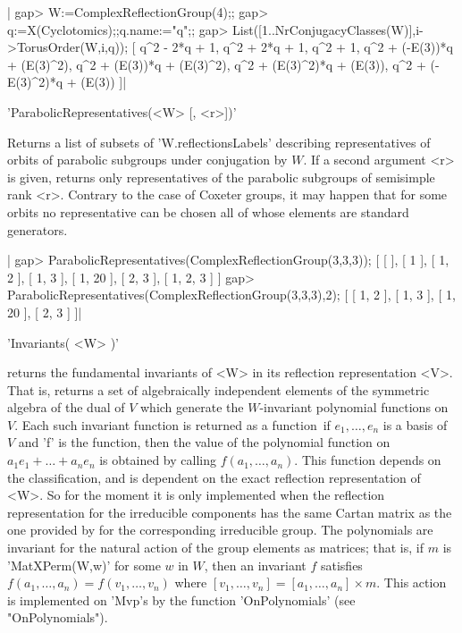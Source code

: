 |    gap> W:=ComplexReflectionGroup(4);;
    gap> q:=X(Cyclotomics);;q.name:="q";;
    gap> List([1..NrConjugacyClasses(W)],i->TorusOrder(W,i,q));
    [ q^2 - 2*q + 1, q^2 + 2*q + 1, q^2 + 1, q^2 + (-E(3))*q + (E(3)^2),
      q^2 + (E(3))*q + (E(3)^2), q^2 + (E(3)^2)*q + (E(3)),
      q^2 + (-E(3)^2)*q + (E(3)) ]|


'ParabolicRepresentatives(<W> [, <r>])'

Returns   a   list   of   subsets   of   'W.reflectionsLabels'   describing
representatives  of orbits of parabolic subgroups under conjugation by $W$.
If  a second  argument <r>  is given,  returns only  representatives of the
parabolic subgroups of semisimple rank <r>.
Contrary  to the case of Coxeter groups, it may happen that for some orbits
no  representative  can  be  chosen  all  of  whose  elements  are standard
generators.

|    gap> ParabolicRepresentatives(ComplexReflectionGroup(3,3,3));
    [ [  ], [ 1 ], [ 1, 2 ], [ 1, 3 ], [ 1, 20 ], [ 2, 3 ], [ 1, 2, 3 ] ]
    gap> ParabolicRepresentatives(ComplexReflectionGroup(3,3,3),2);
    [ [ 1, 2 ], [ 1, 3 ], [ 1, 20 ], [ 2, 3 ] ]|


'Invariants( <W> )'

returns  the fundamental invariants of <W> in its reflection representation
<V>.  That is, returns  a set of  algebraically independent elements of the
symmetric  algebra  of  the  dual  of  $V$ which generate the $W$-invariant
polynomial  functions on $V$. Each such invariant function is returned as a
{\GAP}  function\:\ if $e_1,\ldots,e_n$  is a basis  of $V$ and  'f' is the
{\GAP}   function,   then   the   value   of  the  polynomial  function  on
$a_1e_1+\ldots+a_n  e_n$ is  obtained by  calling $f(a_1,\ldots,a_n)$. This
function  depends  on  the  classification,  and  is dependent on the exact
reflection  representation of <W>. So for the moment it is only implemented
when  the reflection representation for  the irreducible components has the
same  Cartan matrix as the one  provided by {\CHEVIE} for the corresponding
irreducible  group. The polynomials are invariant for the natural action of
the group elements as matrices; that is, if $m$ is 'MatXPerm(W,w)' for some
$w$   in  $W$,   then  an   invariant  $f$   satisfies  $f(a_1,\ldots,a_n)=
f(v_1,\ldots,v_n)$  where $[v_1,\ldots,v_n]=[a_1,\ldots,a_n]\times m$. This
action  is  implemented  on  'Mvp's  by  the  function 'OnPolynomials' (see
"OnPolynomials").

